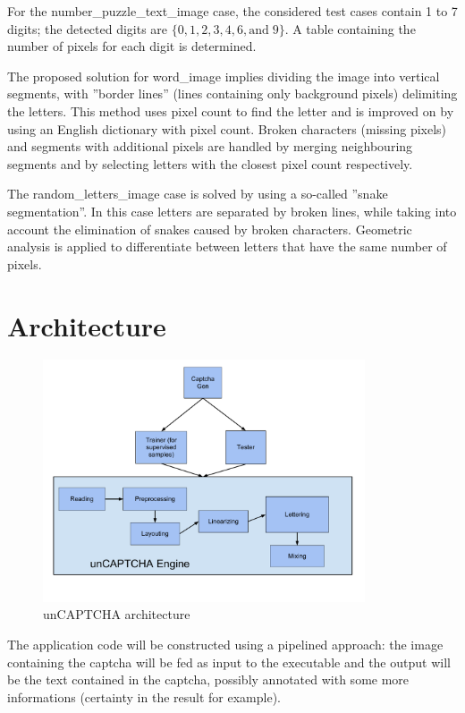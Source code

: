 \documentclass[a4paper,12pt]{article}
\begin{document}
For the number\_puzzle\_text\_image case, the considered test
cases contain 1 to 7 digits; the detected digits are $\{0, 1, 2, 3,
4, 6, \text{and}\; 9\}$. A table containing the number of pixels
for each digit is determined.

The proposed solution for word\_image implies dividing the image
into vertical segments, with ''border lines'' (lines containing only
background pixels) delimiting the letters. This method uses pixel
count to find the letter and is improved on by using an English
dictionary with pixel count. Broken characters (missing pixels)
and segments with additional pixels are handled by merging
neighbouring segments and by selecting letters with the closest
pixel count respectively.

The random\_letters\_image case is solved by using a so-called
''snake segmentation''. In this case letters are separated by
broken lines, while taking into account the elimination of snakes
caused by broken characters. Geometric analysis is applied to
differentiate between letters that have the same number of pixels.

\section*{Architecture}
\begin{figure}[htb]
\centering
\includegraphics[width=0.85\textwidth]{img/unCAPTCHAarchitecturedraft.pdf}
\caption{unCAPTCHA architecture}
\label{fig:architecture}
\end{figure}
The application code will be constructed using a pipelined approach: the image
containing the captcha will be fed as input to the executable and the output
will be the text contained in the captcha, possibly annotated with some more
informations (certainty in the result for example).
\end{document}
